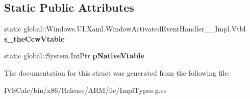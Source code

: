 \subsection*{Static Public Attributes}
\begin{DoxyCompactItemize}
\item 
\mbox{\label{struct_windows_1_1_u_i_1_1_xaml_1_1_window_activated_event_handler_____impl_1_1_vtbl_ae928b1669e8aa0038a63a6cdc6a1e4c3}} 
static global\+::\+Windows.\+U\+I.\+Xaml.\+Window\+Activated\+Event\+Handler\+\_\+\+\_\+\+Impl.\+Vtbl {\bfseries s\+\_\+the\+Ccw\+Vtable}
\item 
\mbox{\label{struct_windows_1_1_u_i_1_1_xaml_1_1_window_activated_event_handler_____impl_1_1_vtbl_ac3d0cc03eb2dca371acf0442fc2600a2}} 
static global\+::\+System.\+Int\+Ptr {\bfseries p\+Native\+Vtable}
\end{DoxyCompactItemize}


The documentation for this struct was generated from the following file\+:\begin{DoxyCompactItemize}
\item 
I\+V\+S\+Calc/bin/x86/\+Release/\+A\+R\+M/ilc/Impl\+Types.\+g.\+cs\end{DoxyCompactItemize}
